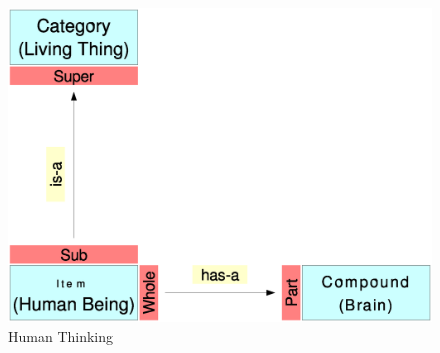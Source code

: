 \begin{figure}[ht]
    \begin{center}
        \includegraphics[scale=0.3]{vector/human_thinking.eps}
        \caption{Human Thinking}
        \label{human_thinking_figure}
    \end{center}
\end{figure}






